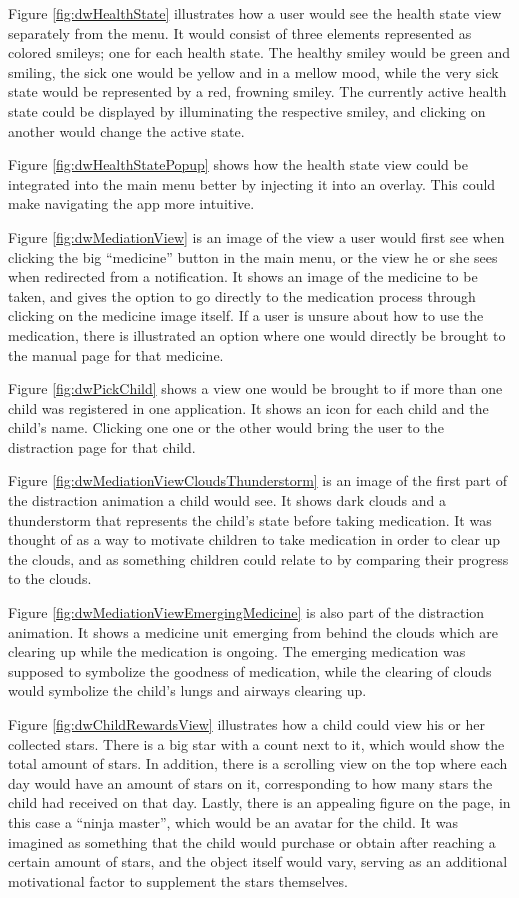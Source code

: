 Figure \ref{fig:dwHealthState} illustrates how a user would see the health state
view separately from the menu. It would consist of three elements represented as
colored smileys; one for each health state. The healthy smiley would be green and
smiling, the sick one would be yellow and in a mellow mood, while the very sick
state would be represented by a red, frowning smiley. The currently active health
state could be displayed by illuminating the respective smiley, and clicking on
another would change the active state.

Figure \ref{fig:dwHealthStatePopup} shows how the health state view could be 
integrated into the main menu better by injecting it into an overlay. This could
make navigating the app more intuitive.

Figure \ref{fig:dwMediationView} is an image of the view a user would first see
when clicking the big ``medicine'' button in the main menu, or the view he or she
sees when redirected from a notification. It shows an image of the medicine to be
taken, and gives the option to go directly to the medication process through
clicking on the medicine image itself. If a user is unsure about how to use the
medication, there is illustrated an option where one would directly be brought to
the manual page for that medicine.

Figure \ref{fig:dwPickChild} shows a view one would be brought to if more than one
child was registered in one application. It shows an icon for each child and the
child's name. Clicking one one or the other would bring the user to the distraction
page for that child.

Figure \ref{fig:dwMediationViewCloudsThunderstorm} is an image of the first part of
the distraction animation a child would see. It shows dark clouds and a thunderstorm
that represents the child's state before taking medication. It was thought of as a 
way to motivate children to take medication in order to clear up the clouds, and as
something children could relate to by comparing their progress to the clouds.

Figure \ref{fig:dwMediationViewEmergingMedicine} is also part of the distraction
animation. It shows a medicine unit emerging from behind the clouds which are clearing
up while the medication is ongoing. The emerging medication was supposed to symbolize
the goodness of medication, while the clearing of clouds would symbolize the child's
lungs and airways clearing up.

Figure \ref{fig:dwChildRewardsView} illustrates how a child could view his or her
collected stars. There is a big star with a count next to it, which would show the 
total amount of stars. In addition, there is a scrolling view on the top where each
day would have an amount of stars on it, corresponding to how many stars the child had
received on that day. Lastly, there is an appealing figure on the page, in this case
a ``ninja master'', which would be an avatar for the child. It was imagined as
something that the child would purchase or obtain after reaching a certain amount of stars,
and the object itself would vary, serving as an additional motivational factor to
supplement the stars themselves.

